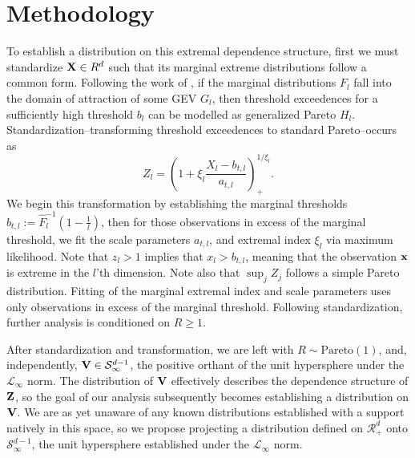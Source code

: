 \section{Methodology}
To establish a distribution on this extremal dependence structure, first we must standardize ${\bf X} \in R^d$
  such that its marginal extreme distributions follow a common form.  Following the work of
  \cite{ferreira2014}, if the marginal distributions $F_{l}$ fall into the domain
  of attraction of some GEV $G_l$, then threshold exceedences for a sufficiently high threshold $b_{l}$
  can be modelled as generalized Pareto $H_l$.  Standardization--transforming threshold exceedences to
  standard Pareto--occurs as
  \begin{equation}
    \label{eqn:standardization}
    Z_l = \left(1 + \xi_l\frac{X_l - b_{t,l}}{a_{t,l}}\right)_{+}^{1/\xi_l}.
  \end{equation}
  We begin this transformation by establishing the marginal thresholds
  $b_{t,l} := \hat{F}_l^{-1}\left(1 - \frac{1}{l}\right)$, then for those observations in excess of
  the marginal threshold, we fit the scale parameters $a_{t,l}$, and extremal index $\xi_l$ via
  maximum likelihood. Note that $z_l > 1$ implies that $x_l > b_{t,l}$, meaning that the observation
  ${\bf x}$ is extreme in the $l$'th dimension.  Note also that $\sup_j Z_j$ follows a simple Pareto
  distribution. Fitting of the marginal extremal index and scale parameters uses only observations in
  excess of the marginal threshold. Following standardization, further analysis is conditioned on
  $R \geq 1$.

After standardization and transformation, we are left with $R\sim\text{Pareto}(1)$, and, independently,
  ${\bf V}\in\mathcal{S}_{\infty}^{d-1}$, the positive orthant of the unit hypersphere under the
  $\mathcal{L}_{\infty}$ norm.  The distribution of ${\bf V}$ effectively describes the dependence
  structure of ${\bf Z}$, so the goal of our analysis subsequently becomes establishing a
  distribution on ${\bf V}$.  We are as yet unaware of any known distributions established with a support
  natively in this space, so we propose projecting a distribution defined on $\mathcal{R}_{+}^{d}$ onto
  $\mathcal{S}_{\infty}^{d-1}$, the unit hypersphere established under the $\mathcal{L}_{\infty}$ norm.







